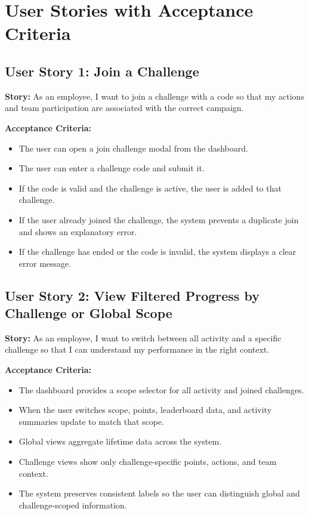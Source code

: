 \documentclass[12pt]{article}
\begin{document}
\section{User Stories with Acceptance Criteria}

\subsection{User Story 1: Join a Challenge}

\textbf{Story:} As an employee, I want to join a challenge with a code so that
my actions and team participation are associated with the correct campaign.

\textbf{Acceptance Criteria:}
\begin{itemize}[leftmargin=1.5em]
    \item The user can open a join challenge modal from the dashboard.
    \item The user can enter a challenge code and submit it.
    \item If the code is valid and the challenge is active, the user is added
    to that challenge.
    \item If the user already joined the challenge, the system prevents a
    duplicate join and shows an explanatory error.
    \item If the challenge has ended or the code is invalid, the system
    displays a clear error message.
\end{itemize}

\subsection{User Story 2: View Filtered Progress by Challenge or Global Scope}

\textbf{Story:} As an employee, I want to switch between all activity and a
specific challenge so that I can understand my performance in the right
context.

\textbf{Acceptance Criteria:}
\begin{itemize}[leftmargin=1.5em]
    \item The dashboard provides a scope selector for all activity and
    joined challenges.
    \item When the user switches scope, points, leaderboard data, and activity
    summaries update to match that scope.
    \item Global views aggregate lifetime data across the system.
    \item Challenge views show only challenge-specific points, actions, and
    team context.
    \item The system preserves consistent labels so the user can distinguish
    global and challenge-scoped information.
\end{itemize}
\end{document}
